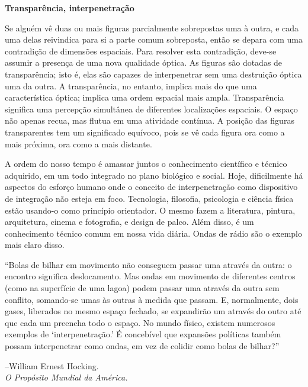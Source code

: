 \documentclass[a4paper]{article}
\begin{document}
\textbf{\large Transparência, interpenetração}

\vspace{1em} %

Se alguém vê duas ou mais figuras parcialmente sobrepostas uma à outra, e cada
uma delas reivindica para si a parte comum sobreposta, então se depara
com uma contradição de dimensões espaciais. Para resolver esta
contradição, deve-se assumir a presença de uma nova qualidade óptica.
As figuras são dotadas de transparência; isto é, elas são capazes de
interpenetrar sem uma destruição óptica uma da outra. A transparência,
no entanto, implica mais do que uma característica óptica; implica
uma ordem espacial mais ampla. Transparência significa uma percepção simultânea
de diferentes localizações espaciais. O espaço não apenas recua, mas flutua em uma
atividade contínua. A posição das figuras transparentes tem um significado
equívoco, pois se vê cada figura ora como a mais próxima, ora como a mais distante.

A ordem do nosso tempo é amassar juntos o conhecimento científico e técnico
adquirido, em um todo integrado no plano biológico e social.
Hoje, dificilmente há aspectos do esforço humano onde o
conceito de interpenetração como dispositivo de integração não esteja em foco.
Tecnologia, filosofia, psicologia e ciência física estão usando-o como
princípio orientador. O mesmo fazem a literatura, pintura, arquitetura, cinema
e fotografia, e design de palco. Além disso, é um conhecimento técnico
comum em nossa vida diária. Ondas de rádio são
o exemplo mais claro disso.

\vspace{2em} %

\parbox[t]{0.45\textwidth}{ %
\small %
``Bolas de bilhar em movimento não conseguem
passar uma através da outra: o encontro significa deslocamento. Mas
ondas em movimento de diferentes centros (como na superfície de uma
lagoa) podem passar uma através da outra sem conflito,
somando-se umas às outras à medida que passam. E, normalmente, dois gases,
liberados no mesmo espaço fechado, se expandirão um através
do outro até que cada um preencha todo o espaço. No mundo físico, existem
numerosos exemplos de `interpenetração.' É concebível
que expansões políticas também possam interpenetrar como ondas,
em vez de colidir como bolas de bilhar?''

\raggedleft %
--William Ernest Hocking.\\
\textit{O Propósito Mundial da América.}
}
\end{document}
